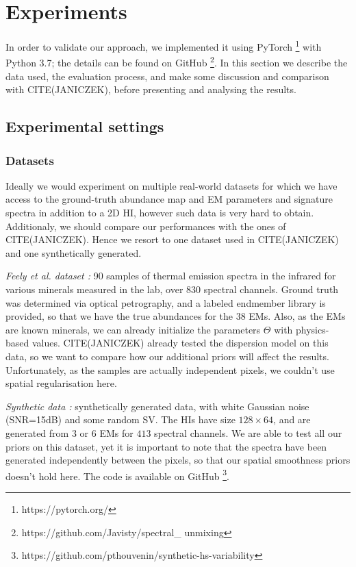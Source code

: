 \documentclass{article}
\begin{document}
\section{Experiments}
In order to validate our approach, we implemented it using \textsf{PyTorch} \footnote{https://pytorch.org/} with \textsf{Python 3.7}; the details can be found on GitHub \footnote{https://github.com/Javisty/spectral\_
unmixing}. In this section we describe the data used, the evaluation process, and make some discussion and comparison with CITE(JANICZEK), before presenting and analysing the results.

\subsection{Experimental settings}
\subsubsection{Datasets}
Ideally we would experiment on multiple real-world datasets for which we have access to the ground-truth abundance map and EM parameters and signature spectra in addition to a 2D HI, however such data is very hard to obtain. Additionaly, we should compare our performances with the ones of CITE(JANICZEK). Hence we resort to one dataset used in CITE(JANICZEK) and one synthetically generated.

\textit{Feely et al. dataset \cite{feely}:} 90 samples of thermal emission spectra in the infrared for various minerals measured in the lab, over $830$ spectral channels. Ground truth was determined via optical petrography, and a labeled endmember library is provided, so that we have the true abundances for the $38$ EMs. Also, as the EMs are known minerals, we can already initialize the parameters $\Theta$ with physics-based values. CITE(JANICZEK) already tested the dispersion model on this data, so we want to compare how our additional priors will affect the results. Unfortunately, as the samples are actually independent pixels, we couldn't use spatial regularisation here.

\textit{Synthetic data \cite{thouvenin}:} synthetically generated data, with white Gaussian noise (SNR=15dB) and some random SV. The HIs have size $128 \times 64$, and are generated from $3$ or $6$ EMs for $413$ spectral channels. We are able to test all our priors on this dataset, yet it is important to note that the spectra have been generated independently between the pixels, so that our spatial smoothness priors doesn't hold here. The code is available on GitHub \footnote{https://github.com/pthouvenin/synthetic-hs-variability}.
\end{document}
